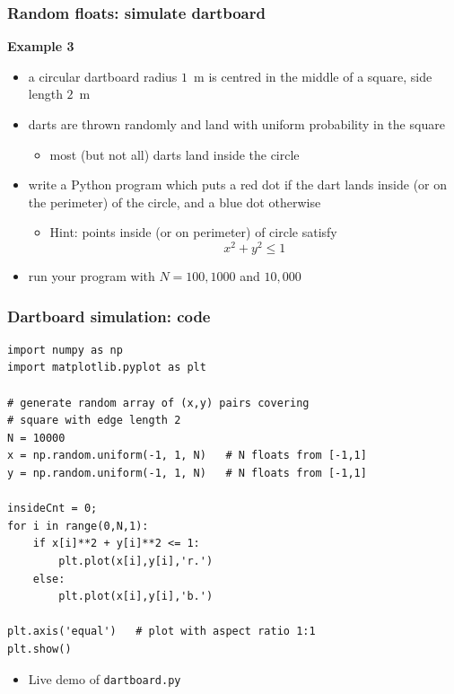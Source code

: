 \documentclass[english,14pt]{beamer}
\newcommand\red[1]{{\color{red} #1}}
\newcommand\blue[1]{{\color{blue} #1}}
\begin{document}

\begin{frame}[fragile]

\frametitle{Random floats: simulate dartboard}

\textbf{Example 3}\\
\vspace*{1mm}
\begin{itemize}
	\item a circular dartboard radius $1$~m is centred in the middle of a square, side length $2$~m
	\item darts are thrown randomly and land with uniform probability in the square
	\begin{itemize}
		\item most (but not all) darts land inside the circle
	\end{itemize}
	\pause
	\item write a Python program which puts a \red{red} dot if the dart lands inside (or on the perimeter) of the circle, and a \blue{blue} dot otherwise
	\begin{itemize}
		\item Hint: points inside (or on perimeter) of circle satisfy
			\[
			x^2 + y^2 \leq 1
			\]
		\end{itemize}
	\item run your program with $N=100, 1000$ and $10,000$
\end{itemize}

\end{frame}


\begin{frame}[fragile]

\frametitle{Dartboard simulation: code}
\begin{lstlisting}[style=CStyle,basicstyle=\scriptsize]
import numpy as np
import matplotlib.pyplot as plt

# generate random array of (x,y) pairs covering
# square with edge length 2
N = 10000
x = np.random.uniform(-1, 1, N)   # N floats from [-1,1]
y = np.random.uniform(-1, 1, N)   # N floats from [-1,1]

insideCnt = 0;
for i in range(0,N,1):
    if x[i]**2 + y[i]**2 <= 1:
        plt.plot(x[i],y[i],'r.')
    else:
        plt.plot(x[i],y[i],'b.')

plt.axis('equal')   # plot with aspect ratio 1:1
plt.show()
\end{lstlisting}
\vspace*{-3mm}
\begin{itemize}
	\item Live demo of \texttt{dartboard.py}
\end{itemize}
\end{frame}
\end{document}
